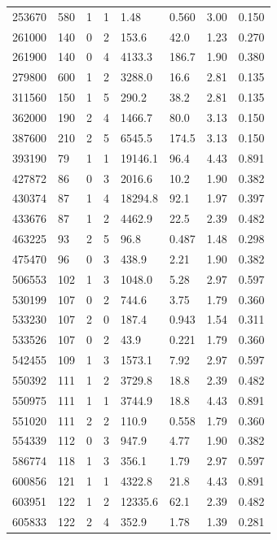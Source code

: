 \documentclass[preview]{standalone}
\begin{document}
{{\begin{tabular}{L{1.2cm}C{1.2cm} C{0.3cm}C{0.5cm} C{1.4cm}C{1.4cm} C{1.4cm}C{1.4cm}}
  253670  &   580  & 1     &  1 &  1.48  & 0.560  & 3.00 &  0.150   \\ 
  261000  &   140  & 0     &  2 &  153.6  & 42.0  & 1.23 &  0.270   \\ 
  261900  &   140  & 0     &  4 &  4133.3  & 186.7  & 1.90 &  0.380   \\ 
  279800  &   600  & 1     &  2 &  3288.0  & 16.6  & 2.81 &  0.135   \\ 
  311560  &   150  & 1     &  5 &  290.2  & 38.2  & 2.81 &  0.135   \\ 
  362000  &   190  & 2     &  4 &  1466.7  & 80.0  & 3.13 &  0.150   \\ 
  387600  &   210  & 2     &  5 &  6545.5  & 174.5  & 3.13 &  0.150   \\ 
  393190  &    79  & 1     &  1 &  19146.1  & 96.4  & 4.43 &  0.891   \\ 
  427872  &    86  & 0     &  3 &  2016.6  & 10.2  & 1.90 &  0.382   \\ 
  430374  &    87  & 1     &  4 &  18294.8  & 92.1  & 1.97 &  0.397   \\ 
  433676  &    87  & 1     &  2 &  4462.9  & 22.5  & 2.39 &  0.482   \\ 
  463225  &    93  & 2     &  5 &  96.8  & 0.487  & 1.48 &  0.298   \\ 
  475470  &    96  & 0     &  3 &  438.9  & 2.21  & 1.90 &  0.382   \\ 
  506553  &   102  & 1     &  3 &  1048.0  & 5.28  & 2.97 &  0.597   \\ 
  530199  &   107  & 0     &  2 &  744.6  & 3.75  & 1.79 &  0.360   \\ 
  533230  &   107  & 2     &  0 &  187.4  & 0.943  & 1.54 &  0.311   \\ 
  533526  &   107  & 0     &  2 &  43.9  & 0.221  & 1.79 &  0.360   \\ 
  542455  &   109  & 1     &  3 &  1573.1  & 7.92  & 2.97 &  0.597   \\ 
  550392  &   111  & 1     &  2 &  3729.8  & 18.8  & 2.39 &  0.482   \\ 
  550975  &   111  & 1     &  1 &  3744.9  & 18.8  & 4.43 &  0.891   \\ 
  551020  &   111  & 2     &  2 &  110.9  & 0.558  & 1.79 &  0.360   \\ 
  554339  &   112  & 0     &  3 &  947.9  & 4.77  & 1.90 &  0.382   \\ 
  586774  &   118  & 1     &  3 &  356.1  & 1.79  & 2.97 &  0.597   \\ 
  600856  &   121  & 1     &  1 &  4322.8  & 21.8  & 4.43 &  0.891   \\ 
  603951  &   122  & 1     &  2 &  12335.6  & 62.1  & 2.39 &  0.482   \\ 
  605833  &   122  & 2     &  4 &  352.9  & 1.78  & 1.39 &  0.281   \\ 
\hline 
\end{tabular} 

}}
\end{document}
